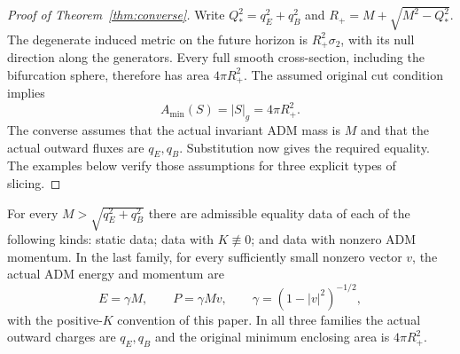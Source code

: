 \begin{proof}[Proof of Theorem~\ref{thm:converse}]
Write $Q_*^2=q_E^2+q_B^2$ and
$R_+=M+\sqrt{M^2-Q_*^2}$.  The degenerate induced metric on the
future horizon is $R_+^2\sigma_2$, with its null direction along
the generators.  Every full smooth cross-section, including the
bifurcation sphere, therefore has area $4\pi R_+^2$.  The assumed
original cut condition implies
\[
 A_{\min}(S)=|S|_g=4\pi R_+^2.
\]
The converse assumes that the actual invariant ADM mass is $M$
and that the actual outward fluxes are $q_E,q_B$.  Substitution
now gives the required equality.  The examples below verify
those assumptions for three explicit types of slicing.
\end{proof}

\begin{proposition}
\label{ri:sharp-examples}
For every $M>\sqrt{q_E^2+q_B^2}$ there are admissible equality
data of each of the following kinds: static data; data with
$K\not\equiv0$; and data with nonzero ADM momentum.  In the
last family, for every sufficiently small nonzero vector $v$,
the actual ADM energy and momentum are
\[
 E=\gamma M,\qquad P=\gamma Mv,\qquad
 \gamma=(1-|v|^2)^{-1/2},
\]
with the positive-$K$ convention of this paper.  In all three
families the actual outward charges are $q_E,q_B$ and the
original minimum enclosing area is $4\pi R_+^2$.
\end{proposition}

